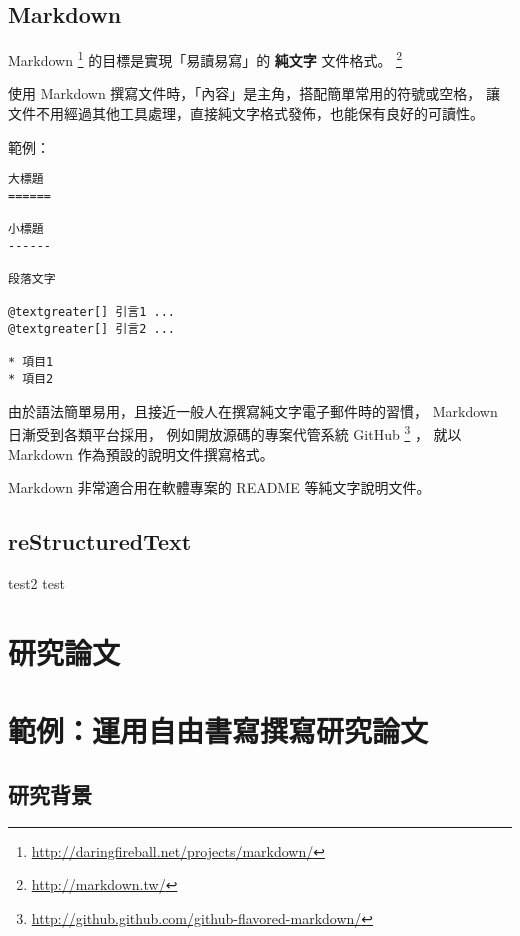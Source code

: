 \documentclass[a4paper,12pt,english]{sphinxmanual}
\begin{document}
\section{Markdown}
\label{syntax:markdown}
Markdown \footnote{
\href{http://daringfireball.net/projects/markdown/}{http://daringfireball.net/projects/markdown/}
} 的目標是實現「易讀易寫」的 \textbf{純文字} 文件格式。 \footnote{
\href{http://markdown.tw/}{http://markdown.tw/}
}

使用 Markdown 撰寫文件時，「內容」是主角，搭配簡單常用的符號或空格，
讓文件不用經過其他工具處理，直接純文字格式發佈，也能保有良好的可讀性。

範例：

\begin{Verbatim}[commandchars=@\[\]]
大標題
======

小標題
------

段落文字

@textgreater[] 引言1 ...
@textgreater[] 引言2 ...

* 項目1
* 項目2
\end{Verbatim}

由於語法簡單易用，且接近一般人在撰寫純文字電子郵件時的習慣，
Markdown 日漸受到各類平台採用，
例如開放源碼的專案代管系統 GitHub \footnote{
\href{http://github.github.com/github-flavored-markdown/}{http://github.github.com/github-flavored-markdown/}
} ，
就以 Markdown 作為預設的說明文件撰寫格式。

Markdown 非常適合用在軟體專案的 README 等純文字說明文件。


\section{reStructuredText}
\label{syntax:restructuredtext}
test2
test


\chapter{研究論文}
\label{thesis::doc}\label{thesis:id1}

\chapter{範例：運用自由書寫撰寫研究論文}
\label{thesis:id2}

\section{研究背景}
\label{thesis:id3}
\end{document}
